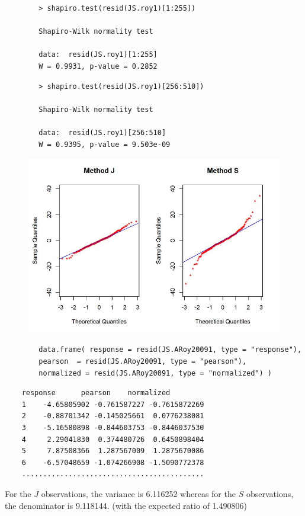 \documentclass[12pt, a4paper]{report}
\theoremstyle{plain}
\theoremstyle{definition}
\theoremstyle{remark}
\begin{document}
	
	\begin{framed}
		\begin{verbatim}
		> shapiro.test(resid(JS.roy1)[1:255])
		
		Shapiro-Wilk normality test
		
		data:  resid(JS.roy1)[1:255]
		W = 0.9931, p-value = 0.2852
		\end{verbatim}
	\end{framed}
	
	\begin{framed}
		\begin{verbatim}
		> shapiro.test(resid(JS.roy1)[256:510])
		
		Shapiro-Wilk normality test
		
		data:  resid(JS.roy1)[256:510]
		W = 0.9395, p-value = 9.503e-09
		\end{verbatim}
	\end{framed}
	\begin{figure}[h!]
		\centering
		\includegraphics[width=0.9\linewidth]{images/Resid-newplot2}
		
	\end{figure}
	
	
	
	\begin{framed}
		\begin{verbatim}
		data.frame( response = resid(JS.ARoy20091, type = "response"), 
		pearson  = resid(JS.ARoy20091, type = "pearson"), 
		normalized = resid(JS.ARoy20091, type = "normalized") )
		\end{verbatim}
	\end{framed}
	
	\begin{verbatim}
	response      pearson    normalized
	1    -4.65805902 -0.761587227 -0.7615872269
	2    -0.88701342 -0.145025661  0.0776238081
	3    -5.16580898 -0.844603753 -0.8446037530
	4     2.29041830  0.374480726  0.6450898404
	5     7.87508366  1.287567009  1.2875670086
	6    -6.57048659 -1.074266908 -1.5090772378
	...........................................
	\end{verbatim}
	For the $J$ observations, the variance is 6.116252 whereas for the $S$ observations, the denominator is 9.118144. (with the expected ratio of  1.490806)
	
\end{document}

